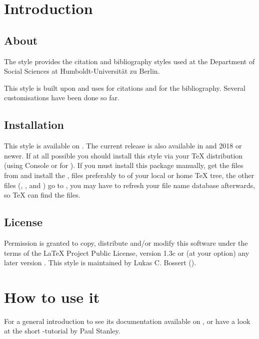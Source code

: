 \documentclass[DIV=11]{scrartcl}
\providecommand*{\printtitlepage}{}
\def\tex{TeX}%
\def\lppl{LaTeX Project Public License}%
\begin{document}
\printtitlepage
\tableofcontents

\section{Introduction}\label{sec:int}
\subsection{About}
The  style provides the citation and bibliography styles used at the Department of Social Sciences at Humboldt-Universität zu Berlin.

This style is built upon  and uses  for  citations and for the bibliography.
Several customisations have been done so far.

\subsection{Installation}\label{sec:install}
This style is available on .%
The current release is also available in \miktex{} and \texlive{} 2018 or
newer.
If at all possible you should install this style via your \tex{} distribution
(using \miktex{} Console or
 for \texlive{}).
If you must install this package manually, get the files from 
and install the ,   files preferably to
 of your local or home \TeX{} tree, the other
files (, ,
 and ) go to
, you may have to refresh your file name database
afterwards, so \tex{} can find the files.

\subsection{License}\label{sec:license}
Permission is granted to copy, distribute and\slash or modify this software
under the terms of the \lppl, version 1.3c%
or (at your option) any later version%
.
This style is maintained by Lukas C. Bossert ().


\section{How to use it}
For a general introduction to  see its documentation available on ,
or have a look at the short -tutorial by Paul Stanley. 
\end{document}
